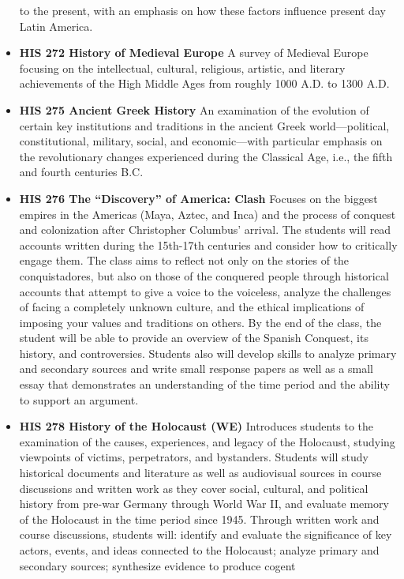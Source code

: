 \documentclass[
  letterpaper,
]{scrbook}
\begin{document}
\begin{itemize}
  to the present, with an emphasis on how these factors influence
  present day Latin America.
\item
  \textbf{HIS 272 History of Medieval Europe} A survey of Medieval
  Europe focusing on the intellectual, cultural, religious, artistic,
  and literary achievements of the High Middle Ages from roughly 1000
  A.D. to 1300 A.D.
\item
  \textbf{HIS 275 Ancient Greek History} An examination of the evolution
  of certain key institutions and traditions in the ancient Greek
  world---political, constitutional, military, social, and
  economic---with particular emphasis on the revolutionary changes
  experienced during the Classical Age, i.e., the fifth and fourth
  centuries B.C.
\item
  \textbf{HIS 276 The ``Discovery'' of America: Clash} Focuses on the
  biggest empires in the Americas (Maya, Aztec, and Inca) and the
  process of conquest and colonization after Christopher Columbus'
  arrival. The students will read accounts written during the 15th-17th
  centuries and consider how to critically engage them. The class aims
  to reflect not only on the stories of the conquistadores, but also on
  those of the conquered people through historical accounts that attempt
  to give a voice to the voiceless, analyze the challenges of facing a
  completely unknown culture, and the ethical implications of imposing
  your values and traditions on others. By the end of the class, the
  student will be able to provide an overview of the Spanish Conquest,
  its history, and controversies. Students also will develop skills to
  analyze primary and secondary sources and write small response papers
  as well as a small essay that demonstrates an understanding of the
  time period and the ability to support an argument.
\item
  \textbf{HIS 278 History of the Holocaust (WE)} Introduces students to
  the examination of the causes, experiences, and legacy of the
  Holocaust, studying viewpoints of victims, perpetrators, and
  bystanders. Students will study historical documents and literature as
  well as audiovisual sources in course discussions and written work as
  they cover social, cultural, and political history from pre-war
  Germany through World War II, and evaluate memory of the Holocaust in
  the time period since 1945. Through written work and course
  discussions, students will: identify and evaluate the significance of
  key actors, events, and ideas connected to the Holocaust; analyze
  primary and secondary sources; synthesize evidence to produce cogent

\end{itemize}
\end{document}
